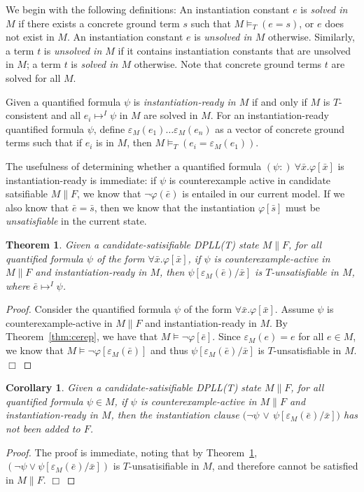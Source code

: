 \documentclass{llncs}
\newtheorem{thm}{Theorem}
\newtheorem{cor}{Corollary}
\begin{document}
We begin with the following definitions:
An instantiation constant $e$ is \emph{solved in $M$} if there exists a concrete ground term $s$ such that $M \models_T (e = s)$, or $e$ does not exist in $M$.
An instantiation constant $e$ is \emph{unsolved in $M$} otherwise.
Similarly, a term $t$ is \emph{unsolved in $M$} if it contains instantiation constants that are unsolved in $M$; a term $t$ is \emph{solved in $M$} otherwise.
Note that concrete ground terms $t$ are solved for all $M$.

Given a quantified formula $\psi$ is \emph{instantiation-ready in $M$} if and only if $M$ is $T$-consistent and all $e_i \mapsto^I \psi$ in $M$ are solved in $M$.
For an instantiation-ready quantified formula $\psi$, define $\varepsilon_M( e_1 ) \ldots \varepsilon_M( e_n )$ as a vector of concrete ground terms such that if $e_i$ is in $M$, then $M \models_T (e_i = \varepsilon_M( e_1 ))$.

The usefulness of determining whether a quantified formula $(\psi:) \ \forall \bar{x}. \varphi[ \bar{x} ]$ is instantiation-ready is immediate:  if $\psi$ is counterexample active in candidate satsifiable $M \parallel F$, we know that $\neg \varphi( \bar{e} )$ is entailed in our current model.
If we also know that $\bar{e} = \bar{s}$, then we know that the instantiation $\varphi[ \bar{s} ]$ must be \emph{unsatisfiable} in the current state.

\begin{thm}
\label{thm:instready}
Given a candidate-satisifiable DPLL(T) state $M \parallel F$, for all quantified formula $\psi$ of the form $\forall \bar{x}. \varphi[ \bar{x} ]$, if $\psi$ is counterexample-active in $M \parallel F$ and instantiation-ready in $M$, then $\psi[\varepsilon_M( \bar{e} )/\bar{x}]$ is $T$-unsatisfiable in $M$, where $\bar{e} \mapsto^I \psi$.
\end{thm}
\begin{proof}
Consider the quantified formula $\psi$ of the form $\forall \bar{x}. \varphi[ \bar{x} ]$.
Assume $\psi$ is counterexample-active in $M \parallel F$ and instantiation-ready in $M$.
By Theorem~\ref{thm:cerep}, we have that $M \models \neg \varphi[\bar{e}]$.
Since $\varepsilon_{M}( e ) = e$ for all $e \in M$, we know that $M \models \neg \varphi[\varepsilon_M( \bar{e} )]$ and thus $\psi[\varepsilon_M( \bar{e} )/\bar{x}]$ is $T$-unsatisfiable in $M$. $\Box$
\end{proof}

\begin{cor}
\label{cor:instready}
Given a candidate-satisifiable DPLL(T) state $M \parallel F$, for all quantified formula $\psi \in M$,
if $\psi$ is counterexample-active in $M \parallel F$ and instantiation-ready in $M$, then the instantiation clause $( \neg \psi$ $\vee$ $\psi[\varepsilon_{M}( \bar{e} )/\bar{x}])$ has not been added to $F$.
\end{cor}
\begin{proof}
The proof is immediate, noting that by Theorem~\ref{thm:instready}, $( \neg \psi \vee \psi[\varepsilon_{M}( \bar{e} )/\bar{x}])$ is $T$-unsatisifiable in $M$, and therefore cannot be satisfied in $M \parallel F$. $\Box$
\end{proof}
\end{document}
